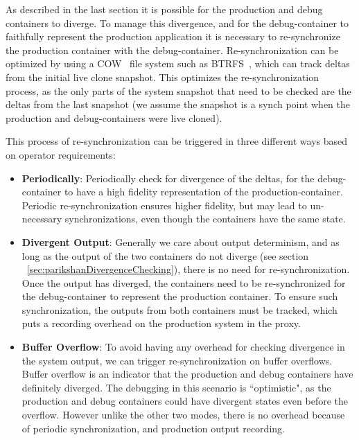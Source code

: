 As described in the last section it is possible for the production and debug containers to diverge. 
To manage this divergence, and for the debug-container to faithfully represent the production application it is necessary to re-synchronize the production container with the debug-container.
Re-synchronization can be optimized by using a COW~\cite{cow} file system such as BTRFS~\cite{btrfs}, which can track deltas from the initial live clone snapshot. 
This optimizes the re-synchronization process, as the only parts of the system snapshot that need to be checked are the deltas from the last snapshot (we assume the snapshot is a synch point when the production and debug-containers were live cloned).

This process of re-synchronization can be triggered in three different ways based on operator requirements:
\begin{itemize}
	
	\item \textbf{Periodically}: Periodically check for divergence of the deltas, for the debug-container to have a high fidelity representation of the production-container.
	Periodic re-synchronization ensures higher fidelity, but may lead to un-necessary synchronizations, even though the containers have the same state.
	
	\item \textbf{Divergent Output}: Generally we care about output determinism, and as long as the output of the two containers do not diverge (see section ~\ref{sec:parikshanDivergenceChecking}), there is no need for re-synchronization.
	Once the output has diverged, the containers need to be re-synchronized for the debug-container to represent the production container. 
	To ensure such synchronization, the outputs from both containers must be tracked, which puts a recording overhead on the production system in the proxy.
	
	\item \textbf{Buffer Overflow}: To avoid having any overhead for checking divergence in the system output, we can trigger re-synchronization on buffer overflows.
	Buffer overflow is an indicator that the production and debug containers have definitely diverged.
	The debugging in this scenario is ``optimistic", as the production and debug containers could have divergent states even before the overflow.
	However unlike the other two modes, there is no overhead because of periodic synchronization, and production output recording.
	
\end{itemize}



